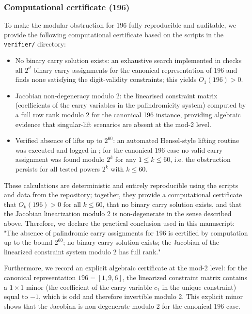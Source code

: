 \documentclass[12pt,a4paper]{article}
\begin{document}
\subsubsection*{Computational certificate (196)}
To make the modular obstruction for 196 fully reproducible and auditable, we provide the following computational certificate based on the scripts in the \texttt{verifier/} directory:
\begin{itemize}
\item No binary carry solution exists: an exhaustive search implemented in \texttt{} checks all $2^d$ binary carry assignments for the canonical representation of 196 and finds none satisfying the digit-validity constraints; this yields $O_1(196)>0$.
\item Jacobian non-degeneracy modulo 2: the linearised constraint matrix (coefficients of the carry variables in the palindromicity system) computed by \texttt{} a full row rank modulo 2 for the canonical 196 instance, providing algebraic evidence that singular-lift scenarios are absent at the mod-2 level.
\item Verified absence of lifts up to $2^{60}$: an automated Hensel-style lifting routine was executed and logged in \texttt{}; for the canonical 196 case no valid carry assignment was found modulo $2^k$ for any $1\le k\le 60$, i.e. the obstruction persists for all tested powers $2^k$ with $k\le 60$.
\end{itemize}

These calculations are deterministic and entirely reproducible using the scripts and data from the repository; together, they provide a computational certificate that $O_k(196)>0$ for all $k \leq 60$, that no binary carry solution exists, and that the Jacobian linearization modulo 2 is non-degenerate in the sense described above. Therefore, we declare the practical conclusion used in this manuscript: "The absence of palindromic carry assignments for 196 is certified by computation up to the bound $2^{60}$; no binary carry solution exists; the Jacobian of the linearized constraint system modulo 2 has full rank."

Furthermore, we record an explicit algebraic certificate at the mod-2 level: for the canonical representation $196=[1,9,6]$, the linearized constraint matrix contains a $1\times 1$ minor (the coefficient of the carry variable $c_1$ in the unique constraint) equal to $-1$, which is odd and therefore invertible modulo 2. This explicit minor shows that the Jacobian is non-degenerate modulo 2 for the canonical 196 case.
\end{document}
